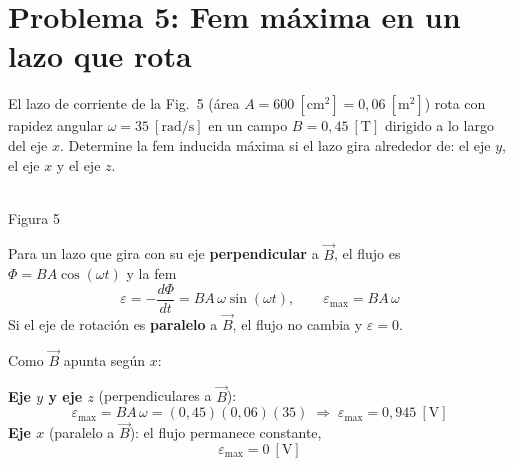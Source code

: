 \documentclass[12pt,letterpaper]{article}
\newcommand{\eps}{\varepsilon}
\begin{document}
\newpage

\section*{Problema 5: Fem m\'axima en un lazo que rota}

\noindent El lazo de corriente de la Fig.\ 5 (\'area $A = 600\ [\text{cm}^2] = 0{,}06\ [\text{m}^2]$)
rota con rapidez angular $\omega = 35\ [\text{rad/s}]$ en un campo $B = 0{,}45\ [\text{T}]$ dirigido
a lo largo del eje $x$. Determine la fem inducida m\'axima si el lazo gira alrededor de: el eje
$y$, el eje $x$ y el eje $z$.

\medskip

\noindent
\begin{minipage}[t]{0.40\textwidth}
\centering\vspace{0pt}
\\[2pt]
{\footnotesize Figura 5}
\end{minipage}%
\hfill
\begin{minipage}[t]{0.57\textwidth}
\vspace{0pt}
Para un lazo que gira con su eje \textbf{perpendicular} a $\vec{B}$, el flujo es
$\Phi = BA\cos(\omega t)$ y la fem
\[
    \eps = -\frac{d\Phi}{dt} = BA\,\omega\sin(\omega t),
    \qquad \eps_{\max} = BA\,\omega
\]
Si el eje de rotaci\'on es \textbf{paralelo} a $\vec{B}$, el flujo no cambia y $\eps = 0$.
\end{minipage}

\medskip

\noindent Como $\vec{B}$ apunta seg\'un $x$:

\noindent\textbf{Eje $y$ y eje $z$} (perpendiculares a $\vec{B}$):
\[
    \eps_{\max} = BA\,\omega = (0{,}45)(0{,}06)(35)
    \;\Rightarrow\; \boxed{\eps_{\max} = 0{,}945\ [\text{V}]}
\]
\textbf{Eje $x$} (paralelo a $\vec{B}$): el flujo permanece constante,
\[
    \boxed{\eps_{\max} = 0\ [\text{V}]}
\]
\end{document}
